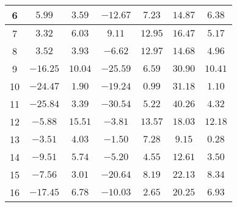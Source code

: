 \begin{table}[H]
\begin{tabular}{|c|c|c|c|c|c|c|}
                        6   &  $5.99$    &  $3.59$   &  $-12.67$  &  $7.23$   &  $14.87$  &  $6.38$  \\ \hline
                        7   &  $3.32$    &  $6.03$   &  $9.11$    &  $12.95$  &  $16.47$  &  $5.17$  \\ \hline
                        8   &  $3.52$    &  $3.93$   &  $-6.62$   &  $12.97$  &  $14.68$  &  $4.96$  \\ \hline
                        9   &  $-16.25$  &  $10.04$  &  $-25.59$  &  $6.59$   &  $30.90$  &  $10.41$ \\ \hline
                        10  &  $-24.47$  &  $1.90$   &  $-19.24$  &  $0.99$   &  $31.18$  &  $1.10$  \\ \hline
                        11  &  $-25.84$  &  $3.39$   &  $-30.54$  &  $5.22$   &  $40.26$  &  $4.32$  \\ \hline
                        12  &  $-5.88$   &  $15.51$  &  $-3.81$   &  $13.57$  &  $18.03$  &  $12.18$ \\ \hline
                        13  &  $-3.51$   &  $4.03$   &  $-1.50$   &  $7.28$   &  $9.15$   &  $0.28$  \\ \hline
                        14  &  $-9.51$   &  $5.74$   &  $-5.20$   &  $4.55$   &  $12.61$  &  $3.50$  \\ \hline
                        15  &  $-7.56$   &  $3.01$   &  $-20.64$  &  $8.19$   &  $22.13$  &  $8.34$  \\ \hline
                        16  &  $-17.45$  &  $6.78$   &  $-10.03$  &  $2.65$   &  $20.25$  &  $6.93$  \\ \hline
                    \end{tabular}
    \label{tab:media_fisica_8_total}
\end{table}

\newpage
